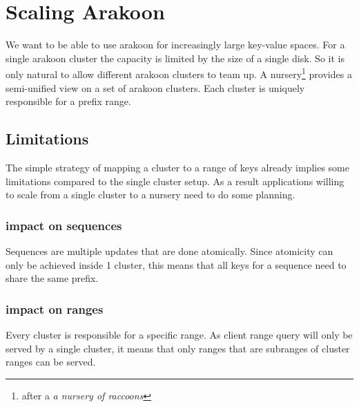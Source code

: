 \section{Scaling Arakoon}
We want to be able to use arakoon for increasingly large key-value spaces. 
For a single arakoon cluster the capacity is limited by the size of a single disk. 
So it is only natural to allow different arakoon clusters to team up. 
A nursery\footnote{after a \emph{a nursery of raccoons}} provides a semi-unified view on a set of arakoon clusters. 
Each cluster is uniquely responsible for a prefix range. 
\subsection{Limitations}
The simple strategy of mapping a cluster to a range of keys already implies some limitations compared to the single cluster setup. As a result applications willing to scale from a single cluster to a nursery need to do some planning.
\subsubsection{impact on sequences}
Sequences are multiple updates that are done atomically. 
Since atomicity can only be achieved inside 1 cluster, this means that all keys for a sequence need to share the same prefix. 
\subsubsection{impact on ranges}
Every cluster is responsible for a specific range. 
As client range query will only be served by a single cluster, it means that only ranges that are subranges of cluster ranges can be served.

